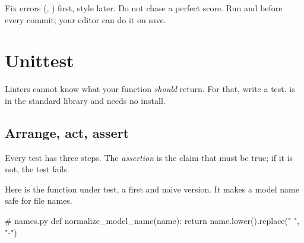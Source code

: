 \begin{gamerule}
Fix errors (, ) first, style later. Do not chase a perfect score. Run  and
 before every commit; your editor can do it on save.
\end{gamerule}

\section{Unittest}

Linters cannot know what your function \emph{should} return. For that, write a test.  is in the
standard library and needs no install.

\subsection{Arrange, act, assert}

Every test has three steps. The \emph{assertion} is the claim that must be true; if it is not, the test fails.

\begin{center}
\end{center}

Here is the function under test, a first and naive version. It makes a model name safe for file names.

\begin{pycode}
# names.py
def normalize_model_name(name):
    return name.lower().replace(" ", "-")
\end{pycode}

